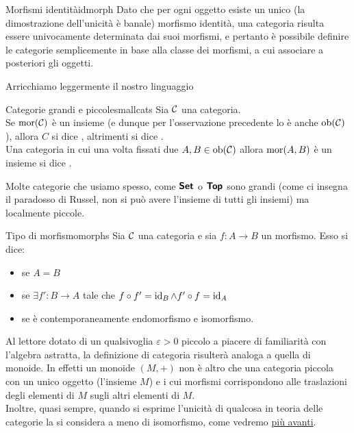 \documentclass{article}
\begin{document}
\begin{remark}{Morfismi identità}{idmorph}
    Dato che per ogni oggetto esiste un unico (la dimostrazione dell'unicità è banale) morfismo identità, una categoria risulta essere univocamente determinata dai suoi morfismi, e pertanto è possibile definire le categorie semplicemente in base alla classe dei morfismi, a cui associare a posteriori gli oggetti.
\end{remark}

Arricchiamo leggermente il nostro linguaggio

\begin{definition}{Categorie grandi e piccole}{smallcats}
    Sia $\mathcal{C}$ una categoria.\\
    Se $\operatorname{mor}(\mathcal{C})$ è un insieme (e dunque per l'osservazione precedente lo è anche $\operatorname{ob}(\mathcal{C})$), allora $C$ si dice , altrimenti si dice .\\
    Una categoria in cui una volta fissati due $A,B \in \operatorname{ob}(\mathcal{C})$ allora $\operatorname{mor}(A,B)$ è un insieme si dice .
\end{definition}

Molte categorie che usiamo spesso, come $\text{\sffamily\textbf{Set}}$ o $\text{\sffamily\textbf{Top}}$ sono grandi (come ci insegna il paradosso di Russel, non si può avere l'insieme di tutti gli insiemi) ma localmente piccole.

\begin{definition}{Tipo di morfismo}{morphs}
    Sia $\mathcal{C}$ una categoria e sia $f:A\to B$ un morfismo. Esso si dice:\begin{itemize}
        \item {} se $A=B$
        \item {} se $\exists f' : B\to A$ tale che $f \circ f' = \operatorname{id}_{B} \wedge f' \circ f = \operatorname{id}_{A}$
        \item {} se è contemporaneamente endomorfismo e isomorfismo.
    \end{itemize}
\end{definition}

Al lettore dotato di un qualsivoglia $\varepsilon > 0$ piccolo a piacere di familiarità con l'algebra astratta, la definizione di categoria risulterà analoga a quella di monoide. In effetti un monoide $(M,+)$ non è altro che una categoria piccola con un unico oggetto (l'insieme $M$) e i cui morfismi corrispondono alle traslazioni degli elementi di $M$ sugli altri elementi di $M$.\\ Inoltre, quasi sempre, quando si esprime l'unicità di qualcosa in teoria delle categorie la si considera a meno di isomorfismo, come vedremo \hyperref[sec:Universal]{più avanti}.
\end{document}
